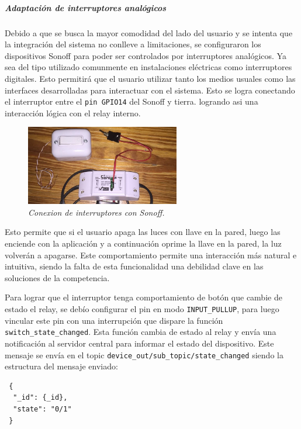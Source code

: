 \subparagraph{Adaptación de interruptores analógicos}

Debido a que se busca la mayor comodidad del lado del usuario y se intenta que la integración del sistema no conlleve a limitaciones, se configuraron los dispositivos Sonoff para poder ser controlados por interruptores analógicos. Ya sea del tipo utilizado comunmente en instalaciones eléctricas como interruptores digitales.
Esto permitirá que el usuario utilizar tanto los medios usuales como las interfaces desarrolladas para interactuar con el sistema. Esto se logra conectando el interruptor entre el \lstinline[columns=fixed]{pin GPIO14} del Sonoff y tierra. logrando asi una interacción lógica con el relay interno.

\begin{figure}[h]
  \centering
  \includegraphics[width=0.6\textwidth, keepaspectratio]{images/sonoff-switch}
  \caption{\textit{Conexion de interruptores con Sonoff.}}
  \label{fig:sonoff-gpio}
\end{figure}

Esto permite que si el usuario apaga las luces con llave en la pared, luego las enciende con la aplicación y a continuación oprime la llave en la pared, la luz volverán a apagarse.
Este comportamiento permite una interacción más natural e intuitiva, siendo la falta de esta funcionalidad una debilidad clave en las soluciones de la competencia.

Para lograr que el interruptor tenga comportamiento de botón que cambie de estado el relay, se debío configurar el pin en modo \lstinline[columns=fixed]{INPUT_PULLUP}, para luego vincular este pin con una interrupción que dispare la función \lstinline[columns=fixed]{switch_state_changed}.
Esta función cambia de estado al relay y envía una notificación al servidor central para informar el estado del dispositivo. Este mensaje se envía en el topic \lstinline[columns=fixed]{device_out/sub_topic/state_changed} siendo la estructura del mensaje enviado:

\begin{lstlisting}
 {
  "_id": {_id},
  "state": "0/1"
 }
\end{lstlisting}

